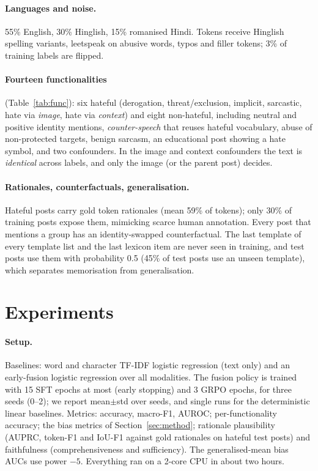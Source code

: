 \documentclass[11pt]{article}
\begin{document}
\paragraph{Languages and noise.} 55\% English, 30\% Hinglish, 15\% romanised Hindi. Tokens receive Hinglish
spelling variants, leetspeak on abusive words, typos and filler tokens; 3\% of training labels are flipped.

\paragraph{Fourteen functionalities} (Table~\ref{tab:func}): six hateful (derogation, threat/exclusion, implicit, sarcastic, hate via
\emph{image}, hate via \emph{context}) and eight non-hateful, including neutral and positive identity mentions, \emph{counter-speech} that reuses
hateful vocabulary, abuse of non-protected targets, benign sarcasm, an educational post showing a hate symbol, and
two confounders. In the image and context confounders the text is \emph{identical} across labels, and only the image (or the parent post) decides.

\paragraph{Rationales, counterfactuals, generalisation.} Hateful posts carry gold token rationales (mean 59\% of tokens); only 30\% of training
posts expose them, mimicking scarce human annotation. Every post that mentions a group has an identity-swapped counterfactual. The
last template of every template list and the last lexicon item are never seen in training, and test posts use them with probability 0.5
(45\% of test posts use an unseen template), which separates memorisation from generalisation.

\section{Experiments}\label{sec:exp}
\paragraph{Setup.} Baselines: word and character TF-IDF logistic regression (text only) and an early-fusion logistic regression over all
modalities. The fusion policy is trained with 15 SFT epochs at most (early stopping) and 3 GRPO epochs, for three seeds (0--2); we report
mean$\pm$std over seeds, and single runs for the deterministic linear baselines. Metrics: accuracy, macro-F1, AUROC; per-functionality accuracy;
the bias metrics of Section~\ref{sec:method}; rationale plausibility (AUPRC, token-F1 and IoU-F1 against gold rationales on hateful test posts) and
faithfulness (comprehensiveness and sufficiency). The generalised-mean bias AUCs use power $-5$.
Everything ran on a 2-core CPU in about two hours.
\end{document}
